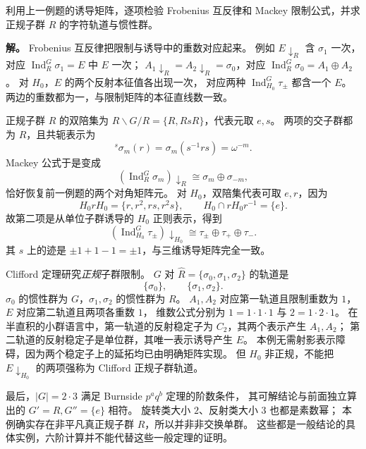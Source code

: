 \begin{workedexample}
\label{ex:d3-comprehensive-clifford}
利用上一例题的诱导矩阵，逐项检验 Frobenius 互反律和 Mackey 限制公式，并求正规子群 $R$ 的字符轨道与惯性群。

\textbf{解。} Frobenius 互反律把限制与诱导中的重数对应起来。
例如 $E\downarrow_R$ 含 $\sigma_1$ 一次，对应
$\operatorname{Ind}_R^G\sigma_1=E$ 中 $E$ 一次；
$A_1\downarrow_R=A_2\downarrow_R=\sigma_0$，对应
$\operatorname{Ind}_R^G\sigma_0=A_1\oplus A_2$。
对 $H_0$，$E$ 的两个反射本征值各出现一次，
对应两种 $\operatorname{Ind}_{H_0}^G\tau_\pm$ 都含一个 $E$。
两边的重数都为一，与限制矩阵的本征直线数一致。

正规子群 $R$ 的双陪集为 $R\backslash G/R=\{R,RsR\}$，代表元取 $e,s$。
两项的交子群都为 $R$，且共轭表示为
\[
{}^s\sigma_m(r)=\sigma_m(s^{-1}rs)=\omega^{-m}.
\]
Mackey 公式于是变成
\[
(\operatorname{Ind}_R^G\sigma_m)\downarrow_R
\cong\sigma_m\oplus\sigma_{-m},
\]
恰好恢复前一例题的两个对角矩阵元。
对 $H_0$，双陪集代表可取 $e,r$，因为
\[
H_0rH_0=\{r,r^2,rs,r^2s\},\qquad
H_0\cap rH_0r^{-1}=\{e\}.
\]
故第二项是从单位子群诱导的 $H_0$ 正则表示，得到
\[
(\operatorname{Ind}_{H_0}^G\tau_\pm)\downarrow_{H_0}
\cong\tau_\pm\oplus\tau_+\oplus\tau_-.
\]
其 $s$ 上的迹是 $\pm1+1-1=\pm1$，与三维诱导矩阵完全一致。

Clifford 定理研究\emph{正规}子群限制。
$G$ 对 $\widehat R=\{\sigma_0,\sigma_1,\sigma_2\}$ 的轨道是
\[
\{\sigma_0\},\qquad\{\sigma_1,\sigma_2\}.
\]
$\sigma_0$ 的惯性群为 $G$，$\sigma_1,\sigma_2$ 的惯性群为 $R$。
$A_1,A_2$ 对应第一轨道且限制重数为 $1$，$E$ 对应第二轨道且两项各重数 $1$，
维数公式分别为 $1=1\cdot1\cdot1$ 与 $2=1\cdot2\cdot1$。
在半直积的小群语言中，第一轨道的反射稳定子为 $C_2$，其两个表示产生 $A_1,A_2$；
第二轨道的反射稳定子是单位群，其唯一表示诱导产生 $E$。
本例无需射影表示障碍，因为两个稳定子上的延拓均已由明确矩阵实现。
但 $H_0$ 非正规，不能把 $E\downarrow_{H_0}$ 的两项强称为 Clifford 正规子群轨道。

最后，$|G|=2\cdot3$ 满足 Burnside $p^aq^b$ 定理的阶数条件，
其可解结论与前面独立算出的 $G'=R,G''=\{e\}$ 相符。
旋转类大小 $2$、反射类大小 $3$ 也都是素数幂；
本例确实存在非平凡真正规子群 $R$，所以并非非交换单群。
这些都是一般结论的具体实例，六阶计算并不能代替这些一般定理的证明。
\end{workedexample}

